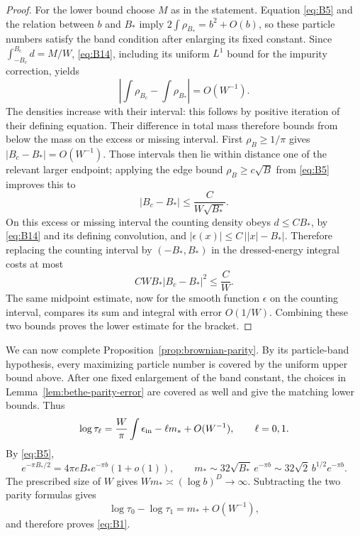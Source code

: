 \begin{proof}
For the lower bound choose $M$ as in the statement.  Equation
\eqref{eq:B5} and the relation between $b$ and $B_*$ imply
$2\int\rho_{B_*}=b^2+O(b)$, so these particle numbers satisfy the
band condition after enlarging its fixed constant.  Since $\int_{-B_c}^{B_c}d=M/W$,
\eqref{eq:B14}, including its uniform $L^1$ bound for the impurity
correction, yields
\[
 \left|\int\rho_{B_c}-\int\rho_{B_*}\right|=O(W^{-1}).
\]
The densities increase with their interval: this follows by positive
iteration of their defining equation.  Their difference in total mass
therefore bounds from below the mass on the excess or missing interval.
First $\rho_B\ge1/\pi$ gives $|B_c-B_*|=O(W^{-1})$.  Those intervals
then lie within distance one of the relevant larger endpoint; applying
the edge bound $\rho_B\ge c\sqrt B$ from \eqref{eq:B5} improves this to
\[
 |B_c-B_*|\le\frac{C}{W\sqrt{B_*}}.
\]
On this excess or missing interval the counting density obeys
$d\le CB_*$, by \eqref{eq:B14} and its defining convolution, and
$|\epsilon(x)|\le C\,\bigl||x|-B_*\bigr|$.  Therefore replacing the
counting interval by $(-B_*,B_*)$ in the dressed-energy integral costs
at most
\[
 CWB_*|B_c-B_*|^2\le\frac{C}{W}.
\]
The same midpoint estimate, now for the smooth function $\epsilon$
on the counting interval, compares its sum and integral with error
$O(1/W)$.  Combining these two bounds proves the lower estimate for the
bracket.
\end{proof}

We can now complete Proposition~\ref{prop:brownian-parity}.  By its
particle-band hypothesis, every maximizing particle number is covered
by the uniform upper bound above.  After one fixed enlargement of the band constant, the choices in
Lemma~\ref{lem:bethe-parity-error} are covered as well and give the
matching lower bounds.  Thus
\[
 \log\tau_\ell
 =\frac{W}{\pi}\int\epsilon_{\rm in}-\ell m_*+O(W^{-1}),
 \qquad \ell=0,1.
\]
By \eqref{eq:B5},
\[
 e^{-\pi B_*/2}=4\pi e B_*e^{-\pi b}(1+o(1)),
 \qquad
 m_*\sim32\sqrt{B_*}\,e^{-\pi b}
       \sim32\sqrt2\,b^{1/2}e^{-\pi b}.
\]
The prescribed size of $W$ gives $Wm_*\asymp(\log b)^D\to\infty$.
Subtracting the two parity formulas gives
\[
 \log\tau_0-\log\tau_1=m_*+O(W^{-1}),
\]
and therefore proves \eqref{eq:B1}.
